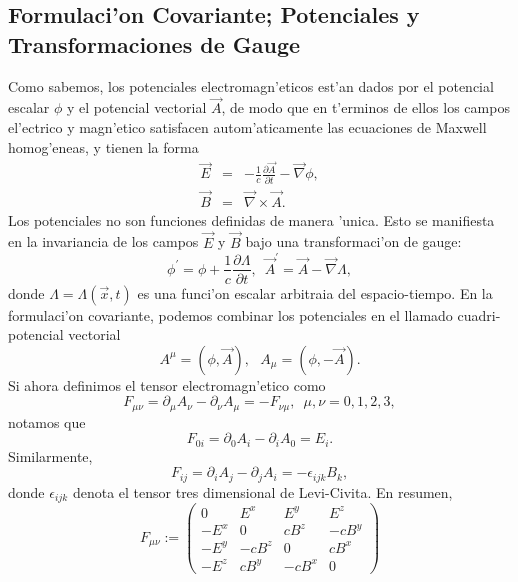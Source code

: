 \subsection{Formulaci'on Covariante; Potenciales y Transformaciones de Gauge}
Como sabemos, los potenciales electromagn'eticos est'an dados por el potencial escalar $\phi$ y el potencial vectorial $\vec{A}$, de modo que en t'erminos de ellos los campos el'ectrico y magn'etico satisfacen autom'aticamente las ecuaciones de Maxwell homog'eneas, y tienen la forma 
\begin{eqnarray}
\vec{E}&=&-\frac{1}{c}\frac{\partial\vec{A}}{\partial t}-\vec{\nabla}\phi, \\
\vec{B}&=&\vec{\nabla}\times\vec{A}.
\end{eqnarray}
Los potenciales no son funciones definidas de manera 'unica. Esto se manifiesta en la invariancia de los campos $\vec{E}$ y  $\vec{B}$ bajo una transformaci'on de gauge:
\begin{equation}
\phi^\prime=\phi+\frac{1}{c}\frac{\partial\Lambda}{\partial t},\,\,\,\vec{A}^\prime=\vec{A}-\vec{\nabla}\Lambda,
\end{equation}
donde $\Lambda=\Lambda(\vec{x},t)$  es una funci'on escalar arbitraia del espacio-tiempo.
En la formulaci'on covariante, podemos combinar los potenciales en el llamado cuadri-potencial vectorial
\begin{equation}
A^\mu=(\phi,\vec{A}),\,\,\,\,A_\mu=(\phi,-\vec{A}).
\end{equation}
Si ahora definimos el tensor electromagn'etico como
\begin{equation}
F_{\mu\nu}=\partial_\mu A_\nu-\partial_\nu A_\mu =-F_{\nu\mu},\,\,\,\mu,\nu=0,1,2,3,
\end{equation}
notamos que
\begin{equation}
F_{0i}=\partial_0 A_i-\partial_i A_0=E_i.
\end{equation}
Similarmente,
\begin{equation}
F_{ij}=\partial_i A_j-\partial_j A_i=-\epsilon_{ijk}B_k,
\end{equation}
donde $\epsilon_{ijk}$ denota el tensor tres dimensional de Levi-Civita.
En resumen,
\begin{equation}
F_{\mu\nu}:=\begin{pmatrix}0 & E^{x} & E^{y} & E^{z}\\
-E^{x} & 0 & cB^{z} & -cB^{y}\\
-E^{y} & -cB^{z} & 0 & cB^{x}\\
-E^{z} & cB^{y} & -cB^{x} & 0
\end{pmatrix}
\end{equation}
